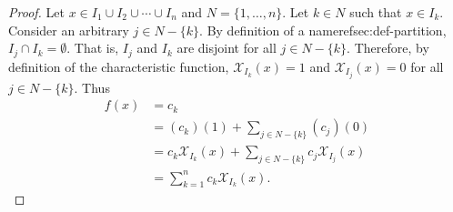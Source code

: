 \documentclass{report}
\begin{document}
\begin{proof}

  Let $x \in I_1 \cup I_2 \cup \cdots \cup I_n$ and $N = \{1, \ldots, n\}$.
  Let $k \in N$ such that $x \in I_k$.
  Consider an arbitrary $j \in N - \{k\}$.
  By definition of a nameref{sec:def-partition}, $I_j \cap I_k = \emptyset$.
  That is, $I_j$ and $I_k$ are disjoint for all $j \in N - \{k\}$.
  Therefore, by definition of the characteristic function,
    $\mathcal{X}_{I_k}(x) = 1$ and $\mathcal{X}_{I_j}(x) = 0$ for all
    $j \in N - \{k\}$.
  Thus
    \begin{align*}
      f(x)
        & = c_k \\
        & = (c_k)(1) + \sum\nolimits_{j \in N - \{k\}} (c_j)(0) \\
        & = c_k\mathcal{X}_{I_k}(x) +
          \sum\nolimits_{j \in N - \{k\}} c_j\mathcal{X}_{I_j}(x) \\
        & = \sum_{k=1}^n c_k\mathcal{X}_{I_k}(x).
    \end{align*}

\end{proof}
\end{document}
